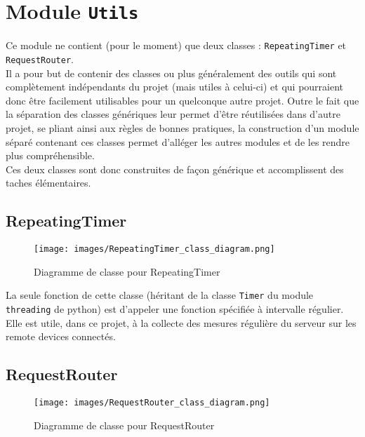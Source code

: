 \documentclass[11pt,a4paper,11pt]{report}
\begin{document}

\section{Module \texttt{Utils}}
\label{Utils}
Ce module ne contient (pour le moment) que deux classes : \texttt{RepeatingTimer} et \texttt{RequestRouter}. \\

Il a pour but de contenir des classes ou plus généralement des outils qui sont complètement indépendants du projet (mais utiles à celui-ci) et qui pourraient donc être facilement utilisables pour un quelconque autre projet. Outre le fait que la séparation des classes génériques leur permet d'être réutilisées dans d'autre projet, se pliant ainsi aux règles de bonnes pratiques, la construction d'un module séparé contenant ces classes permet d'alléger les autres modules et de les rendre plus compréhensible.\\


Ces deux classes sont donc construites de façon générique et accomplissent des taches élémentaires.


\subsection{RepeatingTimer}
\begin{figure}
\centering
\texttt{[image: images/RepeatingTimer\_class\_diagram.png]}
\caption{Diagramme de classe pour RepeatingTimer}
\end{figure}

La seule fonction de cette classe (héritant de la classe \texttt{Timer} du module \texttt{threading} de python) est d'appeler une fonction spécifiée à intervalle régulier. \\

Elle est utile, dans ce projet, à la collecte des mesures régulière du serveur sur les remote devices connectés. \\

\subsection{RequestRouter}
\begin{figure}
\centering
\texttt{[image: images/RequestRouter\_class\_diagram.png]}
\caption{Diagramme de classe pour RequestRouter}
\end{figure}
\end{document}
